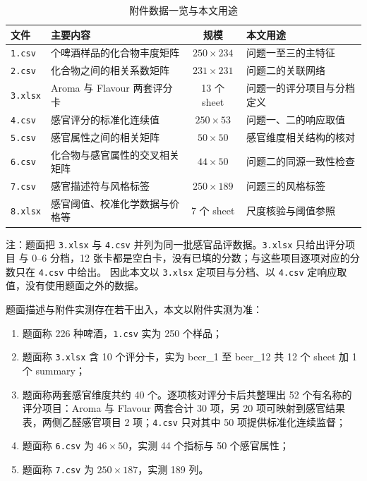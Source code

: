 \documentclass[UTF8,a4paper,zihao=-4]{ctexart}
\numberwithin{figure}{section}
\numberwithin{table}{section}
\numberwithin{equation}{section}
\newcommand{\file}[1]{\texttt{#1}}
\begin{document}
\begin{table}[H]
  \centering
  \caption{附件数据一览与本文用途}
  \label{tab:data}
  \small
  \begin{tabularx}{\textwidth}{@{}l >{\hsize=1.2\hsize}X c >{\hsize=0.8\hsize}X@{}}
    \toprule
    文件 & 主要内容 & 规模 & 本文用途 \\
    \midrule
    \file{1.csv} & 250 个啤酒样品的化合物丰度矩阵 & $250\!\times\!234$ & 问题一至三的主特征 \\
    \file{2.csv} & 化合物之间的相关系数矩阵 & $231\!\times\!231$ & 问题二的关联网络 \\
    \file{3.xlsx} & Aroma 与 Flavour 两套评分卡 & 13 个 sheet & 问题一的评分项目与分档定义 \\
    \file{4.csv} & 感官评分的标准化连续值 & $250\!\times\!53$ & 问题一、二的响应取值 \\
    \file{5.csv} & 感官属性之间的相关矩阵 & $50\!\times\!50$ & 感官维度相关结构的核对 \\
    \file{6.csv} & 化合物与感官属性的交叉相关矩阵 & $44\!\times\!50$ & 问题二的同源一致性检查 \\
    \file{7.csv} & 感官描述符与风格标签 & $250\!\times\!189$ & 问题三的风格标签 \\
    \file{8.xlsx} & 感官阈值、校准化学数据与价格等 & 7 个 sheet & 尺度核验与阈值参照 \\
    \bottomrule
  \end{tabularx}
  \par\vspace{3pt}
  \begin{minipage}{\textwidth}
    \footnotesize 注：题面把 \file{3.xlsx} 与 \file{4.csv} 并列为同一批感官品评数据。\file{3.xlsx} 只给出评分项目
    与 0--6 分档，12 张卡都是空白卡，没有已填的分数；与这些项目逐项对应的分数只在 \file{4.csv} 中给出。
    因此本文以 \file{3.xlsx} 定项目与分档、以 \file{4.csv} 定响应取值，没有使用题面之外的数据。
  \end{minipage}
\end{table}

\pagebreak[3]
题面描述与附件实测存在若干出入，本文以附件实测为准：\par\nobreak

\begin{enumerate}[label=（\arabic*）,leftmargin=2.5em,itemsep=0pt,topsep=2pt,parsep=0pt]
  \item 题面称 226 种啤酒，\file{1.csv} 实为 250 个样品；
  \item 题面称 \file{3.xlsx} 含 10 个评分卡，实为 beer\_1 至 beer\_12 共 12 个 sheet 加 1 个 summary；
  \item 题面称两套感官维度共约 40 个。逐项核对评分卡后共整理出 52 个有名称的评分项目：Aroma 与 Flavour 两套合计 30 项，另 20 项可映射到感官结果表，两侧乙醛感官项目 2 项；\file{4.csv} 只对其中 50 项提供标准化连续监督；
  \item 题面称 \file{6.csv} 为 $46\!\times\!50$，实测 44 个指标与 50 个感官属性；
  \item 题面称 \file{7.csv} 为 $250\!\times\!187$，实测 189 列。
\end{enumerate}
\end{document}
